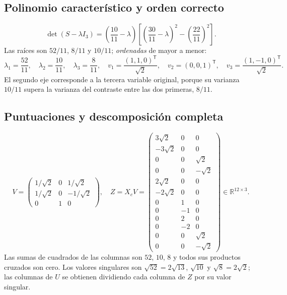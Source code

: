 \documentclass[11pt,a4paper]{article}
\newcommand{\R}{\mathbb R}
\newcommand{\T}{^{\mathsf T}}
\theoremstyle{definition}
\begin{document}
\subsection{Polinomio característico y orden correcto}
\[
\det(S-\lambda I_3)=\left(\frac{10}{11}-\lambda\right)
\left[\left(\frac{30}{11}-\lambda\right)^2-\left(\frac{22}{11}\right)^2\right].
\]
Las raíces son $52/11$, $8/11$ y $10/11$; \emph{ordenadas} de mayor a menor:
\[
\lambda_1=\frac{52}{11},\quad \lambda_2=\frac{10}{11},\quad \lambda_3=\frac8{11},
\quad v_1=\frac{(1,1,0)\T}{\sqrt2},\quad v_2=(0,0,1)\T,\quad
v_3=\frac{(1,-1,0)\T}{\sqrt2}.
\]
El segundo eje corresponde a la tercera variable original, porque su varianza $10/11$ supera la varianza del contraste entre las dos primeras, $8/11$.
\subsection{Puntuaciones y descomposición completa}
\[
V=\begin{pmatrix}1/\sqrt2&0&1/\sqrt2\\1/\sqrt2&0&-1/\sqrt2\\0&1&0\end{pmatrix},\quad
Z=X_cV=\begin{pmatrix}
3\sqrt2&0&0\\-3\sqrt2&0&0\\0&0&\sqrt2\\0&0&-\sqrt2\\2\sqrt2&0&0\\-2\sqrt2&0&0\\
0&1&0\\0&-1&0\\0&2&0\\0&-2&0\\0&0&\sqrt2\\0&0&-\sqrt2
\end{pmatrix}\in\R^{12\times3}.
\]
Las sumas de cuadrados de las columnas son $52$, $10$, $8$ y todos sus productos cruzados son cero. Los valores singulares son $\sqrt{52}=2\sqrt{13}$, $\sqrt{10}$ y $\sqrt8=2\sqrt2$; las columnas de $U$ se obtienen dividiendo cada columna de $Z$ por su valor singular.
\end{document}
